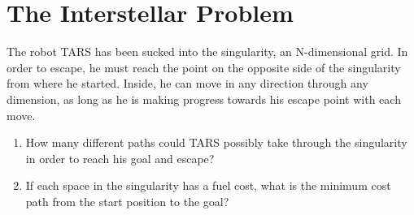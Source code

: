 \chapter{The Interstellar Problem}
The robot TARS has been sucked into the singularity, an N-dimensional grid. In order to escape, he must reach the point on the opposite side of the singularity from where he started.
Inside, he can move in any direction through any dimension, as long as he is making progress towards his escape point with each move.
\begin{enumerate}
    \item How many different paths could TARS possibly take through the singularity in order to reach his goal and escape?
    \item If each space in the singularity has a fuel cost, what is the minimum cost path from the start position to the goal?
\end{enumerate}

